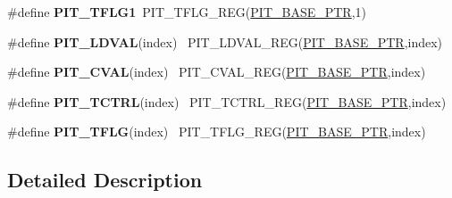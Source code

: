 \begin{DoxyCompactItemize}
\item 
\hypertarget{group___p_i_t___register___accessor___macros_ga5d7ccc39277323f8ca60edc409365aea}{}\#define {\bfseries P\+I\+T\+\_\+\+T\+F\+L\+G1}~P\+I\+T\+\_\+\+T\+F\+L\+G\+\_\+\+R\+E\+G(\hyperlink{group___p_i_t___peripheral_ga70be45f58402a8e6d2ce4df7b23aa41c}{P\+I\+T\+\_\+\+B\+A\+S\+E\+\_\+\+P\+T\+R},1)\label{group___p_i_t___register___accessor___macros_ga5d7ccc39277323f8ca60edc409365aea}

\item 
\hypertarget{group___p_i_t___register___accessor___macros_ga732af43ad85f111181e3a2664f18de3d}{}\#define {\bfseries P\+I\+T\+\_\+\+L\+D\+V\+A\+L}(index)                                              ~P\+I\+T\+\_\+\+L\+D\+V\+A\+L\+\_\+\+R\+E\+G(\hyperlink{group___p_i_t___peripheral_ga70be45f58402a8e6d2ce4df7b23aa41c}{P\+I\+T\+\_\+\+B\+A\+S\+E\+\_\+\+P\+T\+R},index)\label{group___p_i_t___register___accessor___macros_ga732af43ad85f111181e3a2664f18de3d}

\item 
\hypertarget{group___p_i_t___register___accessor___macros_ga1f704e3151c143875a7e5b7885d40401}{}\#define {\bfseries P\+I\+T\+\_\+\+C\+V\+A\+L}(index)                                                ~P\+I\+T\+\_\+\+C\+V\+A\+L\+\_\+\+R\+E\+G(\hyperlink{group___p_i_t___peripheral_ga70be45f58402a8e6d2ce4df7b23aa41c}{P\+I\+T\+\_\+\+B\+A\+S\+E\+\_\+\+P\+T\+R},index)\label{group___p_i_t___register___accessor___macros_ga1f704e3151c143875a7e5b7885d40401}

\item 
\hypertarget{group___p_i_t___register___accessor___macros_ga1e01a4d06bd01661e9e0c6a6be5cd289}{}\#define {\bfseries P\+I\+T\+\_\+\+T\+C\+T\+R\+L}(index)                                              ~P\+I\+T\+\_\+\+T\+C\+T\+R\+L\+\_\+\+R\+E\+G(\hyperlink{group___p_i_t___peripheral_ga70be45f58402a8e6d2ce4df7b23aa41c}{P\+I\+T\+\_\+\+B\+A\+S\+E\+\_\+\+P\+T\+R},index)\label{group___p_i_t___register___accessor___macros_ga1e01a4d06bd01661e9e0c6a6be5cd289}

\item 
\hypertarget{group___p_i_t___register___accessor___macros_ga69836a5d28fbefe3eeac99190be5af1f}{}\#define {\bfseries P\+I\+T\+\_\+\+T\+F\+L\+G}(index)                                                ~P\+I\+T\+\_\+\+T\+F\+L\+G\+\_\+\+R\+E\+G(\hyperlink{group___p_i_t___peripheral_ga70be45f58402a8e6d2ce4df7b23aa41c}{P\+I\+T\+\_\+\+B\+A\+S\+E\+\_\+\+P\+T\+R},index)\label{group___p_i_t___register___accessor___macros_ga69836a5d28fbefe3eeac99190be5af1f}

\end{DoxyCompactItemize}


\subsection{Detailed Description}
